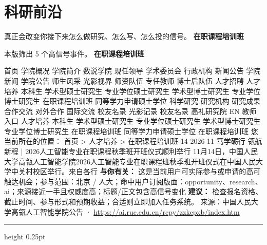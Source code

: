 \documentclass[10.5pt]{ctexart}
\begin{document}
\section*{科研前沿}
{\color{ormuted} 真正会改变你接下来怎么做研究、怎么写、怎么投的信号。}
\vspace{2mm}
{\LARGE\bfseries 在职课程培训班}\par
\vspace{1mm}
{\color{ormuted} 本版筛出 5 个高信号事件。}
\vspace{3mm}
{\Large\bfseries 在职课程培训班}\par
首页 学院概况 学院简介 数说学院 现任领导 学术委员会 行政机构 新闻公告 学院新闻 学院公告 师生风采 光影视界 师资队伍 专任教师 博士后队伍 人才招聘 人才培养 本科生 学术型硕士研究生 专业学位硕士研究生 学术型博士研究生 专业学位博士研究生 在职课程培训班 同等学力申请硕士学位 科学研究 研究机构 研究成果 合作交流 对外合作 国际交流 校友名录 光影记录 校友名录 高礼研究院 EN 教师入口 人才培养 本科生 学术型硕士研究生 专业学位硕士研究生 学术型博士研究生 专业学位博士研究生 在职课程培训班 同等学力申请硕士学位 在职课程培训班 您当前所在的位置： 首页 > 人才培养 > 在职课程培训班 14 2026-11 笃学砺行 瓴航新程 | 2026人工智能专业在职课程秋季班开班仪式顺利举行 11月14日，中国人民大学高瓴人工智能学院2026人工智能专业在职课程班秋季班开班仪式在中国人民大学中关村校区举行。来自各行
\textbf{与你有关：} 这是当前用户可实际参与或申请的高可触达机会；参与范围：北京 / 人大；命中用户订阅版面：opportunity、research、ai；来源接近一手且权威度高；标题/正文包含高信号变化
\textbf{建议：} 检查报名资格、截止时间、参与形式和预期收益；合适则立即加入任务系统。
{\footnotesize\color{ormuted} 来源：中国人民大学高瓴人工智能学院公告 · \url{https://ai.ruc.edu.cn/rcpy/zzkcpxb/index.htm}}
\vspace{4mm}
\hrule height 0.25pt
\vspace{3mm}
\end{document}
